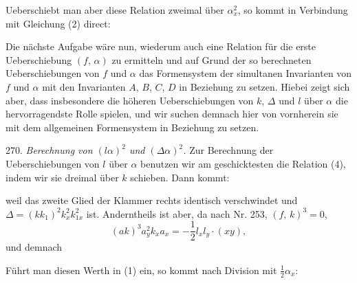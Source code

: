 Ueberschiebt man aber diese Relation zweimal über $\alpha_x^2$, so kommt in Verbindung mit Gleichung (2) direct:

Die nächste Aufgabe wäre nun, wiederum auch eine Relation für die erste Ueberschiebung $(f,\,\alpha)$ zu ermitteln und auf Grund der so berechneten Ueberschiebungen von $f$ und $\alpha$ das Formensystem der simultanen Invarianten von $f$ und $\alpha$ mit den Invarianten $A$, $B$, $C$, $D$ in Beziehung zu setzen. Hiebei zeigt sich aber, dass insbesondere die höheren Ueberschiebungen von $k$, $\Delta$ und $l$ über $\alpha$ die hervorragendste Rolle spielen, und wir suchen demnach hier von vornherein sie mit dem allgemeinen Formensystem in Beziehung zu setzen.

270. \textit{Berechnung von $(l\alpha)^2$ und $(\Delta\alpha)^2$.} Zur Berechnung der Ueberschiebungen von $l$ über $\alpha$ benutzen wir am geschicktesten die Relation (4), indem wir sie dreimal über $k$ schieben. Dann kommt:

weil das zweite Glied der Klammer rechts identisch verschwindet und $\Delta=(kk_1)^2k_x^2k_{1x}^2$ ist. Anderntheils ist aber, da nach Nr. 253, $(f,\,k)^3=0$,
\[
(ak)^3a_y^2k_xa_x=-\frac{1}{2}l_xl_y\cdot(xy),
\]
und demnach

Führt man diesen Werth in (1) ein, so kommt nach Division mit $\frac{1}{2}\alpha_x$:



